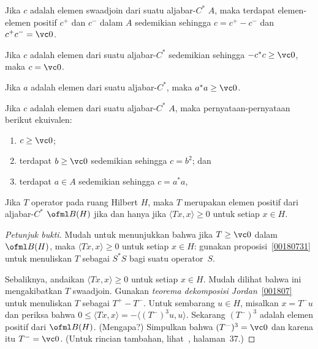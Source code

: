 \begin{thm}\label{001807} Jika $c$ adalah elemen swaadjoin dari suatu
aljabar-$C^*$ $A$, maka terdapat elemen-elemen positif
$c^+$ dan $c^-$ dalam $A$ sedemikian sehingga $c = c^+ - c^-$ dan $c^+c^- = \vc 0$.
\end{thm}

\begin{lem} Jika $c$ adalah elemen dari suatu aljabar-$C^*$ sedemikian sehingga $-c^*c \ge \vc 0$, maka $c
= \vc 0$.
\end{lem}

\begin{prop} Jika $a$ adalah elemen dari suatu aljabar-$C^*$, maka $a^*a \ge \vc 0$.
\end{prop}

\begin{prop}\label{00180731} Jika $c$ adalah elemen dari suatu aljabar-$C^*$ $A$, maka pernyataan-pernyataan
berikut ekuivalen:
 \begin{enumerate}
    \item[(i)] $c \ge \vc 0$;
    \item[(ii)] terdapat $b \ge \vc 0$ sedemikian sehingga $c = b^2$; dan
    \item[(iii)] terdapat $a \in A$ sedemikian sehingga $c = a^*a$,
 \end{enumerate}
\end{prop}

\begin{exam}\label{00180741} Jika $T$ operator pada ruang Hilbert $H$, maka $T$ merupakan
elemen positif dari aljabar-$C^*$ $\ofml B(H)$ jika dan hanya jika $\langle Tx,x \rangle
\ge 0$ untuk setiap $x \in H$.
\end{exam}

\begin{proof}[\emph{Petunjuk bukti}] Mudah untuk menunjukkan bahwa jika $T \ge \vc 0$ dalam $\ofml B(H)$, maka
$\langle Tx,x \rangle \ge 0$ untuk setiap $x \in H$: gunakan proposisi~\ref{00180731} untuk
menuliskan $T$ sebagai $S^*S$ bagi suatu operator~$S$.

Sebaliknya, andaikan $\langle Tx,x \rangle \ge 0$ untuk setiap $x \in H$. Mudah
dilihat bahwa ini mengakibatkan $T$ swaadjoin. Gunakan \emph{teorema dekomposisi
Jordan}~\ref{001807} untuk menuliskan $T$ sebagai $T^+ - T^-$. Untuk sembarang $u \in H$, misalkan $x = T^-u$
dan periksa bahwa $0 \le \langle Tx,x \rangle = -\langle (T^-)^3u,u \rangle$. Sekarang $(T^-)^3$
adalah elemen positif dari $\ofml B(H)$. (Mengapa?) Simpulkan bahwa $(T^-)^3 = \vc 0$ dan
karena itu $T^- = \vc 0$. (Untuk rincian tambahan, lihat~\cite{DoranB:1986}, halaman~37.) \ns
\end{proof}

